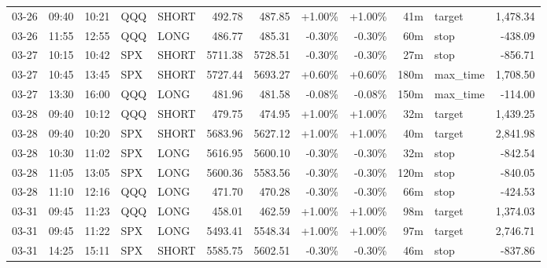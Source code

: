 \documentclass[11pt,a4paper]{article}
\begin{document}
\begin{center}
\begin{longtable}{>{\color{txtmain}}l l l l l r r r r r >{\color{txtmain}}l r}
03-26 & 09:40 & 10:21 & QQQ & SHORT & 492.78 & 487.85 & \textcolor{wingreen}{+1.00\%} & \textcolor{wingreen}{+1.00\%} & 41m & target & \textcolor{wingreen}{1,478.34} \\
03-26 & 11:55 & 12:55 & QQQ & LONG & 486.77 & 485.31 & \textcolor{lossred}{-0.30\%} & \textcolor{lossred}{-0.30\%} & 60m & stop & \textcolor{lossred}{-438.09} \\
03-27 & 10:15 & 10:42 & SPX & SHORT & 5711.38 & 5728.51 & \textcolor{lossred}{-0.30\%} & \textcolor{lossred}{-0.30\%} & 27m & stop & \textcolor{lossred}{-856.71} \\
03-27 & 10:45 & 13:45 & SPX & SHORT & 5727.44 & 5693.27 & \textcolor{wingreen}{+0.60\%} & \textcolor{wingreen}{+0.60\%} & 180m & max\_time & \textcolor{wingreen}{1,708.50} \\
03-27 & 13:30 & 16:00 & QQQ & LONG & 481.96 & 481.58 & \textcolor{lossred}{-0.08\%} & \textcolor{lossred}{-0.08\%} & 150m & max\_time & \textcolor{lossred}{-114.00} \\
03-28 & 09:40 & 10:12 & QQQ & SHORT & 479.75 & 474.95 & \textcolor{wingreen}{+1.00\%} & \textcolor{wingreen}{+1.00\%} & 32m & target & \textcolor{wingreen}{1,439.25} \\
03-28 & 09:40 & 10:20 & SPX & SHORT & 5683.96 & 5627.12 & \textcolor{wingreen}{+1.00\%} & \textcolor{wingreen}{+1.00\%} & 40m & target & \textcolor{wingreen}{2,841.98} \\
03-28 & 10:30 & 11:02 & SPX & LONG & 5616.95 & 5600.10 & \textcolor{lossred}{-0.30\%} & \textcolor{lossred}{-0.30\%} & 32m & stop & \textcolor{lossred}{-842.54} \\
03-28 & 11:05 & 13:05 & SPX & LONG & 5600.36 & 5583.56 & \textcolor{lossred}{-0.30\%} & \textcolor{lossred}{-0.30\%} & 120m & stop & \textcolor{lossred}{-840.05} \\
03-28 & 11:10 & 12:16 & QQQ & LONG & 471.70 & 470.28 & \textcolor{lossred}{-0.30\%} & \textcolor{lossred}{-0.30\%} & 66m & stop & \textcolor{lossred}{-424.53} \\
03-31 & 09:45 & 11:23 & QQQ & LONG & 458.01 & 462.59 & \textcolor{wingreen}{+1.00\%} & \textcolor{wingreen}{+1.00\%} & 98m & target & \textcolor{wingreen}{1,374.03} \\
03-31 & 09:45 & 11:22 & SPX & LONG & 5493.41 & 5548.34 & \textcolor{wingreen}{+1.00\%} & \textcolor{wingreen}{+1.00\%} & 97m & target & \textcolor{wingreen}{2,746.71} \\
03-31 & 14:25 & 15:11 & SPX & SHORT & 5585.75 & 5602.51 & \textcolor{lossred}{-0.30\%} & \textcolor{lossred}{-0.30\%} & 46m & stop & \textcolor{lossred}{-837.86} \\

\end{longtable}
\end{center}
\end{document}

